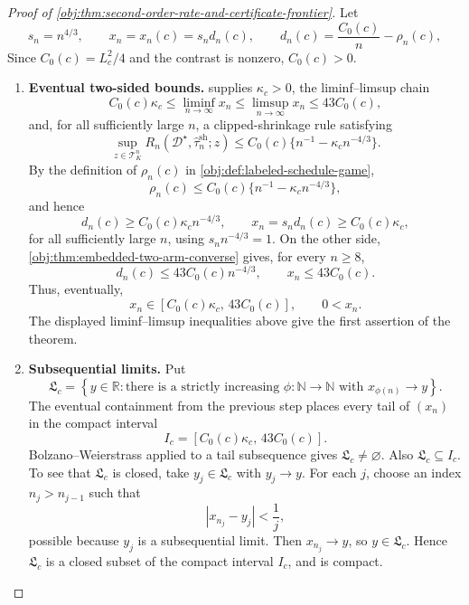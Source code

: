 \begin{proof}[Proof of \cref{obj:thm:second-order-rate-and-certificate-frontier}]
Let
\[
s_n=n^{4/3},
\qquad
x_n=x_n(c)=s_n d_n(c),
\qquad
d_n(c)=\frac{C_0(c)}{n}-\rho_n(c),
\]
Since \(C_0(c)=L_c^2/4\) and the contrast is nonzero, \(C_0(c)>0\).

\begin{enumerate}
\item \textbf{Eventual two-sided bounds.}
 supplies \(\kappa_c>0\), the liminf--limsup chain
\[
C_0(c)\kappa_c
\leq
\liminf_{n\to\infty}x_n
\leq
\limsup_{n\to\infty}x_n
\leq
43C_0(c),
\]
and, for all sufficiently large \(n\), a clipped-shrinkage rule satisfying
\[
\sup_{z\in\mathcal T_K^n}
R_n(\mathcal D^\star,\widehat\tau_n^{\mathrm{sh}};z)
\le
C_0(c)\{n^{-1}-\kappa_c n^{-4/3}\}.
\]
By the definition of \(\rho_n(c)\) in \cref{obj:def:labeled-schedule-game},
\[
\rho_n(c)
\le
C_0(c)\{n^{-1}-\kappa_c n^{-4/3}\},
\]
and hence
\[
d_n(c)\ge C_0(c)\kappa_c n^{-4/3},
\qquad
x_n=s_nd_n(c)\ge C_0(c)\kappa_c ,
\]
for all sufficiently large \(n\), using \(s_n n^{-4/3}=1\). On the other side, \cref{obj:thm:embedded-two-arm-converse} gives, for every \(n\ge8\),
\[
d_n(c)\le 43C_0(c)n^{-4/3},
\qquad
x_n\le 43C_0(c).
\]
Thus, eventually,
\[
x_n\in
\left[C_0(c)\kappa_c,\,43C_0(c)\right],
\qquad
0<x_n.
\]
The displayed liminf--limsup inequalities above give the first assertion of the theorem. %

\item \textbf{Subsequential limits.}
Put
\[
\mathfrak L_c
=
\left\{y\in\mathbb R:
\text{there is a strictly increasing }\phi:\mathbb N\to\mathbb N
\text{ with }x_{\phi(n)}\to y\right\}.
\]
The eventual containment from the previous step places every tail of \((x_n)\) in the compact interval
\[
I_c=\left[C_0(c)\kappa_c,\,43C_0(c)\right].
\]
Bolzano--Weierstrass applied to a tail subsequence gives \(\mathfrak L_c\neq\varnothing\). Also \(\mathfrak L_c\subseteq I_c\). To see that \(\mathfrak L_c\) is closed, take \(y_j\in\mathfrak L_c\) with \(y_j\to y\). For each \(j\), choose an index \(n_j>n_{j-1}\) such that
\[
|x_{n_j}-y_j|<\frac1j,
\]
possible because \(y_j\) is a subsequential limit. Then \(x_{n_j}\to y\), so \(y\in\mathfrak L_c\). Hence \(\mathfrak L_c\) is a closed subset of the compact interval \(I_c\), and is compact. %


\end{enumerate}
\end{proof}

